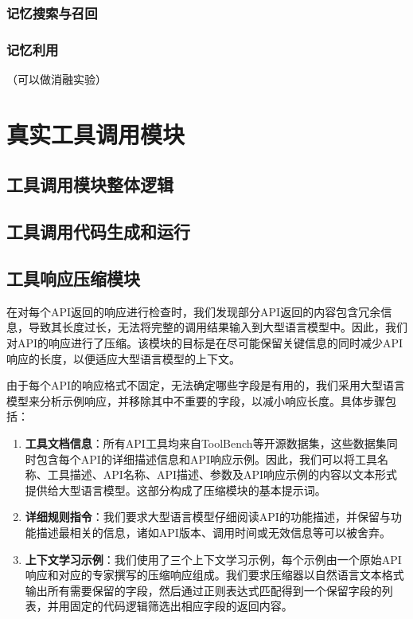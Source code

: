 \subsubsection{记忆搜索与召回}
\subsubsection{记忆利用}
（可以做消融实验）

\section{真实工具调用模块}
\label{sec:real_tool_simulation}

\subsection{工具调用模块整体逻辑}

\subsection{工具调用代码生成和运行}

\subsection{工具响应压缩模块}

在对每个API返回的响应进行检查时，我们发现部分API返回的内容包含冗余信息，导致其长度过长，无法将完整的调用结果输入到大型语言模型中。因此，我们对API的响应进行了压缩。该模块的目标是在尽可能保留关键信息的同时减少API响应的长度，以便适应大型语言模型的上下文。

由于每个API的响应格式不固定，无法确定哪些字段是有用的，我们采用大型语言模型来分析示例响应，并移除其中不重要的字段，以减小响应长度。具体步骤包括：

\begin{enumerate}
    \item \textbf{工具文档信息}：所有API工具均来自ToolBench等开源数据集，这些数据集同时包含每个API的详细描述信息和API响应示例。因此，我们可以将工具名称、工具描述、API名称、API描述、参数及API响应示例的内容以文本形式提供给大型语言模型。这部分构成了压缩模块的基本提示词。
    
    \item \textbf{详细规则指令}：我们要求大型语言模型仔细阅读API的功能描述，并保留与功能描述最相关的信息，诸如API版本、调用时间或无效信息等可以被舍弃。
    
    \item \textbf{上下文学习示例}：我们使用了三个上下文学习示例，每个示例由一个原始API响应和对应的专家撰写的压缩响应组成。我们要求压缩器以自然语言文本格式输出所有需要保留的字段，然后通过正则表达式匹配得到一个保留字段的列表，并用固定的代码逻辑筛选出相应字段的返回内容。
\end{enumerate}

